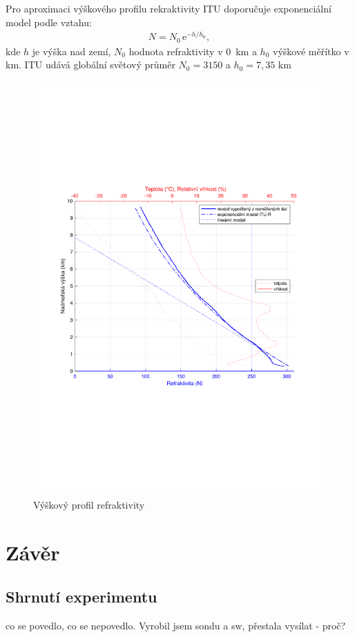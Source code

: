 \documentclass[twoside]{ctuthesis}
\newcommand{\mt}[1]{\text{#1}}
\theoremstyle{plain}
\theoremstyle{definition}
\theoremstyle{note}
\begin{document}
	Pro aproximaci výškového profilu rekraktivity ITU doporučuje exponenciální model podle vztahu:
	\begin{align}
		N = N_\text{0}\,\text{e}^{-h/h_\text{0}},
	\end{align}
	kde $h$ je výška nad zemí, $N_\text{0}$ hodnota refraktivity v 0~km a $h_\text{0}$ výškové měřítko v km. ITU udává globální světový průměr $N_\text{0} = 315 \text{0}$ a $h_\text{0} = 7{,}35 \mt{ km}$

	\begin{figure}[hbtp]
		\centering
		\includegraphics[width=.7\textwidth]{Graphs/refractivity_exp_lin_meas_hum.pdf}
		\caption{Výškový profil refraktivity}
		\label{graph:refr}
	\end{figure}
















	


\chapter{Závěr}
	\section{Shrnutí experimentu}
	co se povedlo, co se nepovedlo. Vyrobil jsem sondu a sw, přestala vysílat - proč? 
\end{document}
